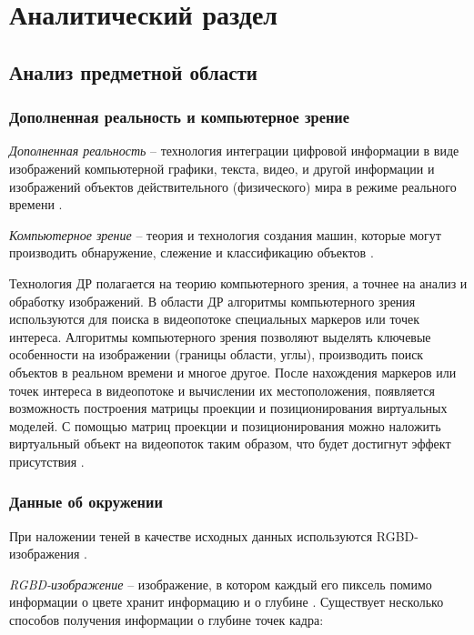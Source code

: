 \chapter{Аналитический раздел}

\section{Анализ предметной области}

\subsection*{Дополненная реальность и компьютерное зрение}

\textit{Дополненная реальность} -- технология интеграции цифровой информации в виде изображений компьютерной графики, текста, видео, и другой информации и изображений объектов действительного (физического) мира в режиме реального времени \cite{tech-ar}.

\textit{Компьютерное зрение} -- теория и технология создания машин, которые могут производить обнаружение, слежение и классификацию объектов \cite{comp_vision}. 

Технология ДР полагается на теорию компьютерного зрения, а точнее на анализ и обработку изображений. В области ДР алгоритмы компьютерного зрения используются для поиска в видеопотоке специальных маркеров или точек интереса. Алгоритмы компьютерного зрения позволяют выделять ключевые особенности на изображении (границы области, углы), производить поиск объектов в реальном времени и многое другое. После нахождения маркеров или точек интереса в видеопотоке и вычислении их местоположения, появляется возможность построения матрицы проекции и позиционирования виртуальных моделей. С помощью матриц проекции и позиционирования можно наложить виртуальный объект на видеопоток таким образом, что будет достигнут эффект присутствия \cite{tech-ar}.

\subsection*{Данные об окружении}

При наложении теней в качестве исходных данных используются RGBD-изображения \cite{debevec2008rendering} \cite{sns_tras}.

\textit{RGBD-изображение} -- изображение, в котором каждый его пиксель помимо информации о цвете хранит информацию и о глубине \cite{rgbd}. Существует несколько способов получения информации о глубине точек кадра:

